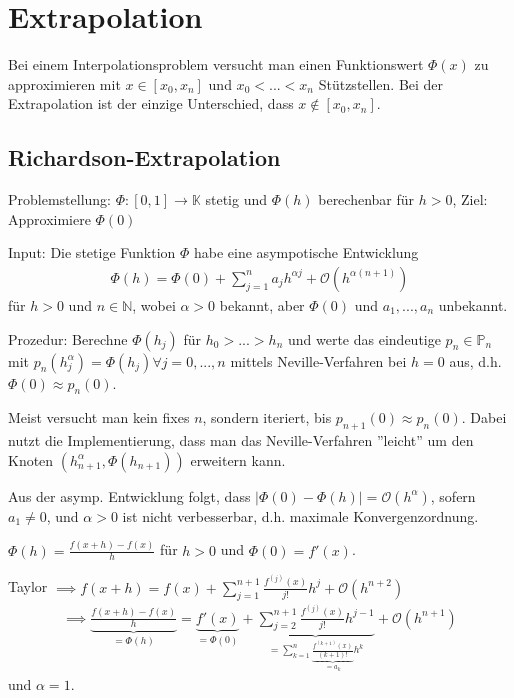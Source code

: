 \section{Extrapolation}

Bei einem Interpolationsproblem versucht man einen Funktionswert $\Phi(x)$ zu approximieren mit $x \in [x_0, x_n]$ und $x_0 < ... < x_n$ Stützstellen. Bei der Extrapolation ist der einzige Unterschied, dass $x \notin [x_0, x_n]$.

\subsection{Richardson-Extrapolation}

Problemstellung: $\Phi:[0, 1] \rightarrow \mathbb{K}$ stetig und $\Phi(h)$ berechenbar für $h>0$, Ziel: Approximiere $\Phi(0)$

\begin{algorithm}
	Input: Die stetige Funktion $\Phi$ habe eine asympotische Entwicklung
	\begin{align*}
		\Phi(h) = \Phi(0) + \sum_{j=1}^{n} a_j h^{\alpha j} + \mathcal{O}(h^{\alpha (n+1)}) 
	\end{align*}
	für $h>0$ und $n\in \mathbb{N}$, wobei $\alpha > 0$ bekannt, aber $\Phi(0)$ und $a_1, ..., a_n$ unbekannt.
	
	Prozedur: Berechne $\Phi(h_j)$ für $h_0 > ... > h_n$ und werte das eindeutige $p_n \in \mathbb{P}_n$ mit $p_n(h_j^\alpha) = \Phi(h_j) \forall j=0, ..., n$ mittels Neville-Verfahren bei $h=0$ aus, d.h. $\Phi(0) \approx p_n(0)$.
\end{algorithm}

\begin{remark}
	Meist versucht man kein fixes $n$, sondern iteriert, bis $p_{n+1}(0) \approx p_n(0)$. Dabei nutzt die Implementierung, dass man das Neville-Verfahren ''leicht'' um den Knoten $(h_{n+1}^\alpha, \Phi(h_{n+1}))$ erweitern kann.
\end{remark}

\begin{remark}
	Aus der asymp. Entwicklung folgt, dass $|\Phi(0) - \Phi(h)| = \mathcal{O}(h^\alpha)$, sofern $a_1 \neq 0$, und $\alpha > 0$ ist nicht verbesserbar, d.h. maximale Konvergenzordnung.
\end{remark}

\begin{example}
	$\Phi(h) = \frac{f(x+h) - f(x)}{h}$ für $h>0$ und $\Phi(0) = f'(x)$.
	
	Taylor $\implies f(x+h) = f(x) + \sum_{j=1}^{n+1} \frac{f^{(j)}(x)}{j!}h^j + \mathcal{O}(h^{n+2})$
	\begin{align*}
		\implies \underbrace{\frac{f(x+h)-f(x)}{h}}_{=\Phi(h)} = \underbrace{f'(x)}_{=\Phi(0)} + \underbrace{\sum_{j=2}^{n+1} \frac{f^{(j)}(x)}{j!} h^{j-1}}_{=\sum_{k=1}^{n} \underbrace{\frac{f^{(k+1)}(x)}{(k+1)!}}_{=a_k} h^k} + \mathcal{O}(h^{n+1})
	\end{align*}
	und $\alpha = 1$.
\end{example}

